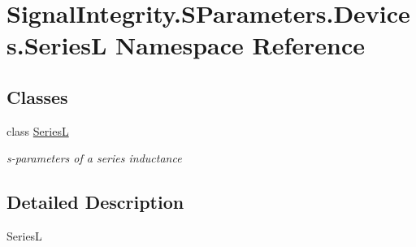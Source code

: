 \hypertarget{namespaceSignalIntegrity_1_1SParameters_1_1Devices_1_1SeriesL}{}\section{Signal\+Integrity.\+S\+Parameters.\+Devices.\+SeriesL Namespace Reference}
\label{namespaceSignalIntegrity_1_1SParameters_1_1Devices_1_1SeriesL}
\subsection*{Classes}
\begin{DoxyCompactItemize}
\item 
class \hyperlink{classSignalIntegrity_1_1SParameters_1_1Devices_1_1SeriesL_1_1SeriesL}{SeriesL}
\begin{DoxyCompactList}\small\item\em s-\/parameters of a series inductance \end{DoxyCompactList}\end{DoxyCompactItemize}


\subsection{Detailed Description}
\begin{DoxyVerb}SeriesL\end{DoxyVerb}
 